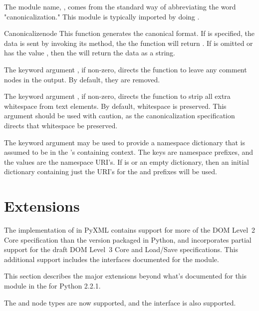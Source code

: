 \documentclass{howto}
\begin{document}
The module name, , comes from the standard way of abbreviating
the word "canonicalization."
This module is typically imported by doing
.

\begin{funcdesc}{Canonicalize}{node}
This function generates the canonical format.
If  is specified, the data is sent by invoking its
 method, the the function will return .
If  is omitted or has the value , then
the  will return the data as a string.

The keyword argument , if non-zero, directs the function
to leave any comment nodes in the output. By default, they are removed.

The keyword argument , if non-zero, directs the function
to strip all extra whitespace from text elements.
By default, whitespace is preserved.
This argument should be used with caution, as the canonicalization
specification directs that whitespace be preserved.

The keyword argument  may be used to provide a namespace
dictionary that is assumed to be in the 's containing
context.
The keys are namespace prefixes, and the values are the namespace URI's.
If  is  or an empty dictionary, then an initial
dictionary containing just the URI's for the  and 
prefixes will be used.
\end{funcdesc}


\section{ Extensions}

The implementation of  in PyXML contains
support for more of the DOM Level~2 Core specification than the
version packaged in Python, and incorporates partial support for the
draft DOM Level~3 Core and Load/Save specifications.  This additional
support includes the interfaces documented for the
 module.

This section describes the major extensions beyond what's documented
for this module in the  for Python 2.2.1.

The  and  node types are now supported,
and the  interface is also supported.
\end{document}
